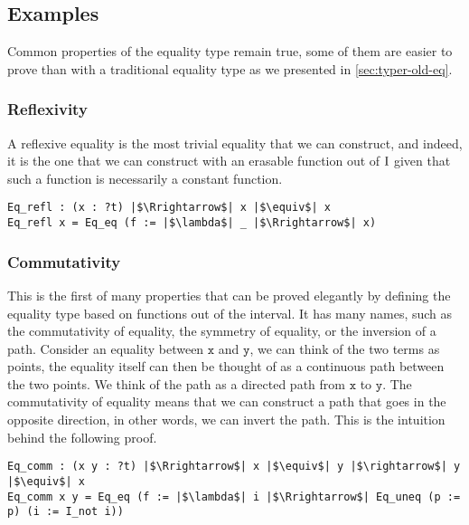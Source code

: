 \documentclass[12pt,twoside,maitrise]{dms}
\theoremstyle{definition}
\numberwithin{equation}{section}
\numberwithin{table}{chapter}
\numberwithin{figure}{chapter}
\newcommand\id[1] {\texttt{#1}}
\begin{document}
\subsection{Examples}\label{subsec:eq-examples}
Common properties of the equality type remain true, some of them are easier to
prove than with a traditional equality type as we presented in
\autoref{sec:typer-old-eq}.

\subsubsection*{Reflexivity}
A reflexive equality is the most trivial equality that we can construct, and
indeed, it is the one that we can construct with an erasable function out of
$\mathrm{I}$ given that such a function is necessarily a constant function.

\begin{verbatim}
Eq_refl : (x : ?t) |$\Rrightarrow$| x |$\equiv$| x
Eq_refl x = Eq_eq (f := |$\lambda$| _ |$\Rrightarrow$| x)
\end{verbatim}

\subsubsection*{Commutativity}
This is the first of many properties that can be proved elegantly by defining
the equality type based on functions out of the interval. It has many names,
such as the commutativity of equality, the symmetry of equality, or the
inversion of a path. Consider an equality between $\id{x}$ and $\id{y}$, we can
think of the two terms as points, the equality itself can then be thought of as
a continuous path between the two points. We think of the path as a directed
path from $\id{x}$ to $\id{y}$. The commutativity of equality means that we can
construct a path that goes in the opposite direction, in other words, we can
invert the path. This is the intuition behind the following proof.

\begin{verbatim}
Eq_comm : (x y : ?t) |$\Rrightarrow$| x |$\equiv$| y |$\rightarrow$| y |$\equiv$| x
Eq_comm x y = Eq_eq (f := |$\lambda$| i |$\Rrightarrow$| Eq_uneq (p := p) (i := I_not i))
\end{verbatim}
\end{document}
